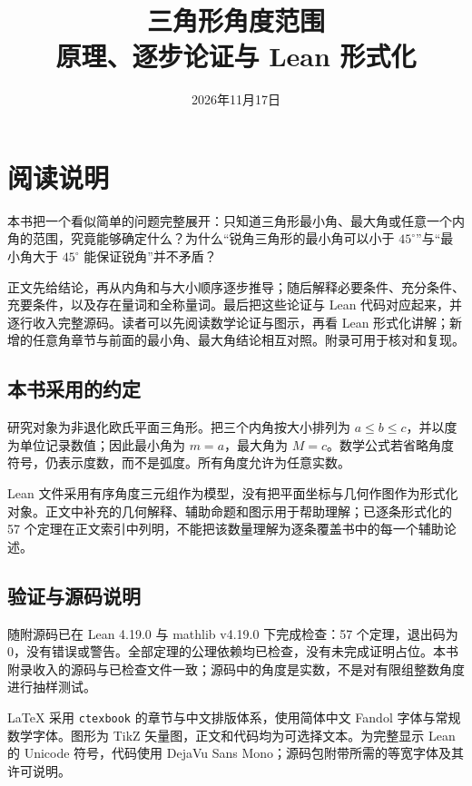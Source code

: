 \documentclass[UTF8,a4paper,zihao=-4,oneside,openany,fontset=fandol]{ctexbook}
\title{三角形角度范围\\[0.5em]\large 原理、逐步论证与 Lean 形式化}
\author{}
\date{2026年11月17日}
\theoremstyle{definition}
\theoremstyle{remark}
\begin{document}
\frontmatter
\maketitle
\chapter*{阅读说明}

本书把一个看似简单的问题完整展开：只知道三角形最小角、最大角或任意一个内角的范围，究竟能够确定什么？为什么“锐角三角形的最小角可以小于 $45^\circ$”与“最小角大于 $45^\circ$ 能保证锐角”并不矛盾？

正文先给结论，再从内角和与大小顺序逐步推导；随后解释必要条件、充分条件、充要条件，以及存在量词和全称量词。最后把这些论证与 Lean 代码对应起来，并逐行收入完整源码。读者可以先阅读数学论证与图示，再看 Lean 形式化讲解；新增的任意角章节与前面的最小角、最大角结论相互对照。附录可用于核对和复现。

\section*{本书采用的约定}

研究对象为非退化欧氏平面三角形。把三个内角按大小排列为 $a\le b\le c$，并以度为单位记录数值；因此最小角为 $m=a$，最大角为 $M=c$。数学公式若省略角度符号，仍表示度数，而不是弧度。所有角度允许为任意实数。

Lean 文件采用有序角度三元组作为模型，没有把平面坐标与几何作图作为形式化对象。正文中补充的几何解释、辅助命题和图示用于帮助理解；已逐条形式化的 57 个定理在正文索引中列明，不能把该数量理解为逐条覆盖书中的每一个辅助论述。

\section*{验证与源码说明}

随附源码已在 Lean 4.19.0 与 mathlib v4.19.0 下完成检查：57 个定理，退出码为 0，没有错误或警告。全部定理的公理依赖均已检查，没有未完成证明占位。本书附录收入的源码与已检查文件一致；源码中的角度是实数，不是对有限组整数角度进行抽样测试。

LaTeX 采用 \texttt{ctexbook} 的章节与中文排版体系，使用简体中文 Fandol 字体与常规数学字体。图形为 TikZ 矢量图，正文和代码均为可选择文本。为完整显示 Lean 的 Unicode 符号，代码使用 DejaVu Sans Mono；源码包附带所需的等宽字体及其许可说明。

\begingroup
\small
\tableofcontents
\endgroup
\mainmatter
\end{document}
